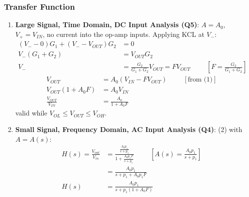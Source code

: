 \subsubsection{Transfer Function}
\begin{enumerate}
  \item \textbf{Large Signal, Time Domain, DC Input Analysis (Q5)}: \(A = A_0\),
    \(V_+ = V_{IN}\), no current into the op-amp inputs.
    Applying KCL at \(V_-\):
    \begin{align*}
      (V_- - 0) G_1 + (V_- - V_{OUT}) G_2 &= 0 \\
      V_-(G_1 + G_2) &= V_{OUT} G_2 \\
      V_- &= \frac{G_2}{G_1 + G_2} V_{OUT} = F V_{OUT} \hspace{1cm} \left[F = \tfrac{G_2}{G_1 + G_2}\right] \tag{1}
    \end{align*}
    \begin{align*}
      V_{OUT} &= A_0(V_{IN} - F V_{OUT}) \hspace{1cm} [\text{from (1)}] \\
      V_{OUT}(1 + A_0 F) &= A_0 V_{IN} \\
      \frac{V_{OUT}}{V_{IN}} &= \frac{A_0}{1 + A_0 F} \tag{2}
    \end{align*}
    valid while \(V_{OL} \leq V_{OUT} \leq V_{OH}\).
  \item \textbf{Small Signal, Frequency Domain, AC Input Analysis (Q4)}: (2) with
    \(A = A(s)\):
    \begin{align*}
      H(s) = \frac{V_{out}}{V_{in}} &= \frac{\frac{A_0 p_1}{s + p_1}}{1 + \frac{A_0 p_1 F}{s + p_1}} \hspace{1cm} \left[A(s) = \tfrac{A_0 p_1}{s + p_1}\right] \\
      &= \frac{A_0 p_1}{s + p_1 + A_0 p_1 F} \\
      H(s) &= \frac{A_0 p_1}{s + p_1(1 + A_0 F)} \tag{3}
    \end{align*}
\end{enumerate}


